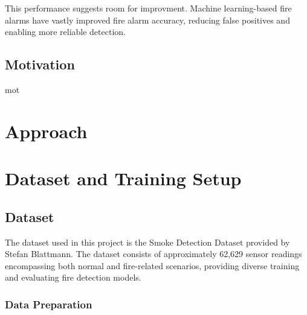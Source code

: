 \documentclass[conference]{IEEEtran}
\begin{document}
This performance suggests room for improvment. Machine
learning-based fire alarms have vastly improved fire alarm
accuracy, reducing false positives and enabling more
reliable detection.

\subsection{Motivation}\label{mot}

mot

\section{Approach}

\section{Dataset and Training Setup}
\subsection{Dataset}
The dataset used in this project is the Smoke Detection
Dataset provided by Stefan Blattmann. The dataset consists
of approximately 62,629 sensor readings encompassing both
normal and fire-related scenarios, providing diverse
training and evaluating fire detection models.

\subsubsection{Data Preparation}
\end{document}
